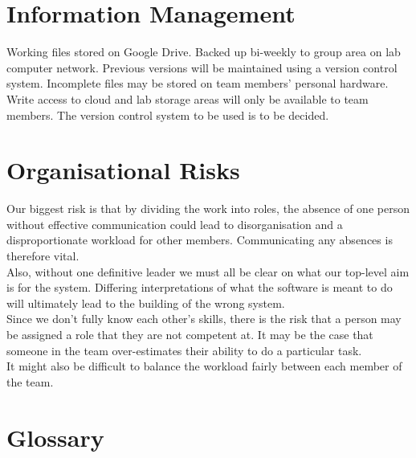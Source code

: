\documentclass{l3deliverable}
\begin{document}

\section{Information Management}

Working files stored on Google Drive. Backed up bi-weekly to group area on lab computer network. Previous versions will be maintained using a version control system. Incomplete files may be stored on team members' personal hardware.
Write access to cloud and lab storage areas will only be available to team members.
The version control system to be used is to be decided. 


\section{Organisational Risks}

Our biggest risk is that by dividing the work into roles, the absence of one person without effective communication could lead to disorganisation and a disproportionate workload for other members. Communicating any absences is therefore vital.
\\
Also, without one definitive leader we must all be clear on what our top-level aim is for the system. Differing interpretations of what the software is meant to do will ultimately lead to the building of the wrong system.
\\
Since we don't fully know each other's skills, there is the risk that a person may be assigned a role that they are not competent at. It may be the case that someone in the team over-estimates their ability to do a particular task. 
\\
It might also be difficult to balance the workload fairly between each member of the team. 


\appendix


\section{Glossary}




\end{document}
